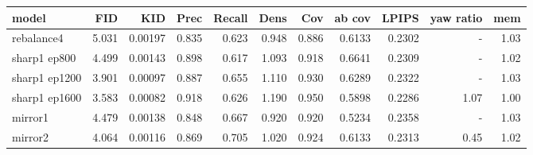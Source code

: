 \begin{tabular}{lrrrrrrrrrr}
\hline
model & FID & KID & Prec & Recall & Dens & Cov & ab cov & LPIPS & yaw ratio & mem \\
\hline
rebalance4 & 5.031 & 0.00197 & 0.835 & 0.623 & 0.948 & 0.886 & 0.6133 & 0.2302 & - & 1.03 \\
sharp1 ep800 & 4.499 & 0.00143 & 0.898 & 0.617 & 1.093 & 0.918 & 0.6641 & 0.2309 & - & 1.02 \\
sharp1 ep1200 & 3.901 & 0.00097 & 0.887 & 0.655 & 1.110 & 0.930 & 0.6289 & 0.2322 & - & 1.03 \\
sharp1 ep1600 & 3.583 & 0.00082 & 0.918 & 0.626 & 1.190 & 0.950 & 0.5898 & 0.2286 & 1.07 & 1.00 \\
mirror1 & 4.479 & 0.00138 & 0.848 & 0.667 & 0.920 & 0.920 & 0.5234 & 0.2358 & - & 1.03 \\
mirror2 & 4.064 & 0.00116 & 0.869 & 0.705 & 1.020 & 0.924 & 0.6133 & 0.2313 & 0.45 & 1.02 \\
\hline
\end{tabular}
